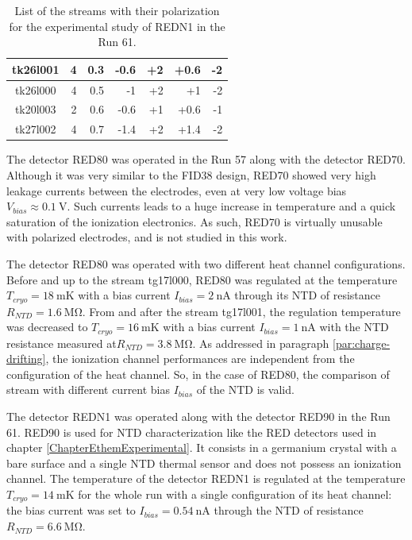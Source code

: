 \begin{table}[]
\begin{tabular}{c|rrrrrr}
tk26l001  & 4                  & 0.3                  & -0.6                  & +2                  & +0.6                  & -2                  \\ \hline
tk26l000  & 4                  & 0.5                  & -1                    & +2                  & +1                    & -2                  \\ \hline
tk20l003  & 2                  & 0.6                  & -0.6                  & +1                  & +0.6                  & -1                  \\ \hline
tk27l002  & 4                  & 0.7                  & -1.4                  & +2                  & +1.4                  & -2                 
\end{tabular}%
\caption{List of the streams with their polarization for the experimental study of REDN1 in the Run 61.}
\label{tab:redn1-stream-list}
\end{table}

The detector RED80 was operated in the Run 57 along with the detector RED70. Although it was very similar to the FID38 design, RED70 showed very high leakage currents between the electrodes, even at very low voltage bias $V_{bias} \approx \SI{0.1}{\volt}$. Such currents leads to a huge increase in temperature and a quick saturation of the ionization electronics. As such, RED70 is virtually unusable with polarized electrodes, and is not studied in this work.

The detector RED80 was operated with two different heat channel configurations. Before and up to the stream tg17l000, RED80 was regulated at the temperature $T_{cryo}=\SI{18}{\milli\kelvin}$ with a bias current $I_{bias} = \SI{2}{\nano\ampere}$ through its NTD of resistance $R_{NTD}=\SI{1.6}{\mega\ohm}$. From and after the stream tg17l001, the regulation temperature was decreased to $T_{cryo}=\SI{16}{\milli\kelvin}$ with a bias current $I_{bias} = \SI{1}{\nano\ampere}$ with the NTD resistance measured at$R_{NTD}=\SI{3.8}{\mega\ohm}$.
As addressed in paragraph \ref{par:charge-drifting}, the ionization channel performances are independent from the configuration of the heat channel. So, in the case of RED80, the comparison of stream with different current bias $I_{bias}$ of the NTD is valid.

The detector REDN1 was operated along with the detector RED90 in the Run 61. RED90 is used for NTD characterization like the RED detectors used in chapter \ref{ChapterEthemExperimental}. It consists in a germanium crystal with a bare surface and a single NTD thermal sensor and does not possess an ionization channel.
The temperature of the detector REDN1 is regulated at the temperature $T_{cryo}=\SI{14}{\milli\kelvin}$ for the whole run with a single configuration of its heat channel: the bias current was set to $I_{bias}=\SI{0.54}{\nano\ampere}$ through the NTD of resistance $R_{NTD} = \SI{6.6}{\mega\ohm}$.


